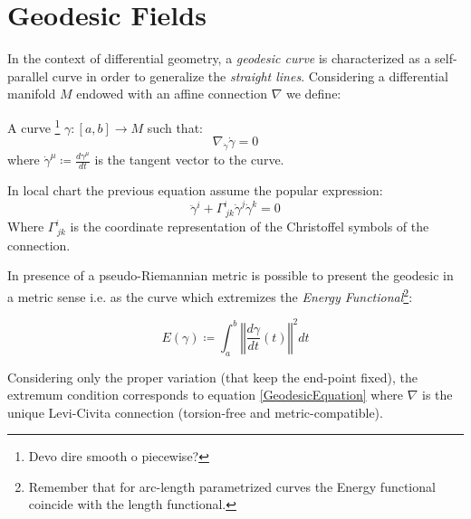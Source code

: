 \documentclass[Main]{subfiles}
\begin{document}
\chapter{Geodesic Fields}
	In the context of differential geometry, a \emph{geodesic curve} is characterized as a self-parallel curve in order to generalize the \emph{straight lines}.
	Considering a differential manifold $M$ endowed with an affine connection $\nabla$ we define:
	\begin{definition}[Geodesic]
		A curve \danger\footnote{Devo dire smooth o piecewise? }
		$\gamma:[a,b]\rightarrow M$ such that:
		\begin{equation}
			\nabla_{\dot{\gamma}}\dot{\gamma} =0
		\end{equation}
		where $\dot{\gamma}^\mu \coloneqq \frac{d \gamma^\mu}{d t}$ is the tangent vector to the curve.
	\end{definition}
	\begin{notationfix}
		In local chart the previous equation assume the popular expression:
		\begin{equation}\label{GeodesicEquation}
			\ddot{\gamma}^i + \Gamma^i_{\, j k} \dot{\gamma}^j \dot{\gamma}^k = 0
		\end{equation}
		Where $ \Gamma^i_{\, j k}$ is the coordinate representation of the Christoffel symbols of the connection.
	\end{notationfix}
	\vspace{4mm}
	
	In presence of a pseudo-Riemannian metric is possible to present the geodesic in a metric sense i.e. as the curve  which extremizes the \emph{Energy Functional}\footnote{Remember that for arc-length parametrized curves the Energy functional coincide with the length functional.\cite[Lemma $1.4.2$ ]{Jost2005}}:
	\begin{definition}
  	\begin{equation}\label{EnergyFunctional}
 		E(\gamma) \coloneqq \int_a^b \left\Vert \frac{d \gamma}{dt} (t)\right\Vert^2 dt
 	\end{equation}
\end{definition} 	
	Considering only the proper variation (that keep the end-point fixed), the extremum condition corresponds to equation \ref{GeodesicEquation} where $\nabla$ is the unique Levi-Civita connection (torsion-free and metric-compatible).
	\vspace{4mm}
	
\end{document}
